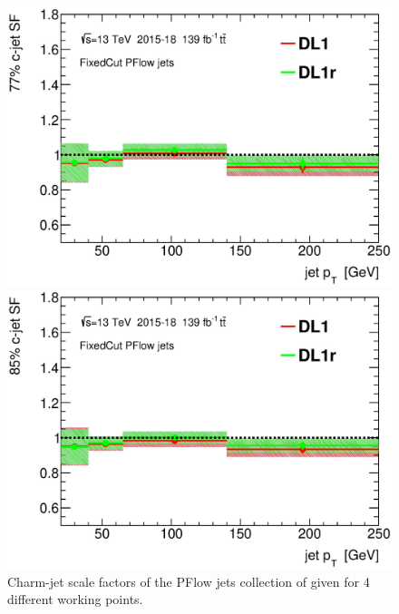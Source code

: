 \documentclass[letterpaper,12pt]{article}
\begin{document}
\begin{figure}[H]
\begin{minipage}[b]{.45\textwidth}
\includegraphics[width=1\textwidth]{SFplots_december/DL1allPFlowDec_DL1rallPFlowDec/SF77.eps}
\end{minipage}\hfill
\begin{minipage}[b]{.45\textwidth}
\centering
\includegraphics[width=1\textwidth]{SFplots_december/DL1allPFlowDec_DL1rallPFlowDec/SF85.eps}
\end{minipage}
\caption{Charm-jet scale factors of the PFlow jets collection of 
given for 4 different working points.} \label{fig:Dec_SF_PFlow}
\end{figure}
\end{document}
